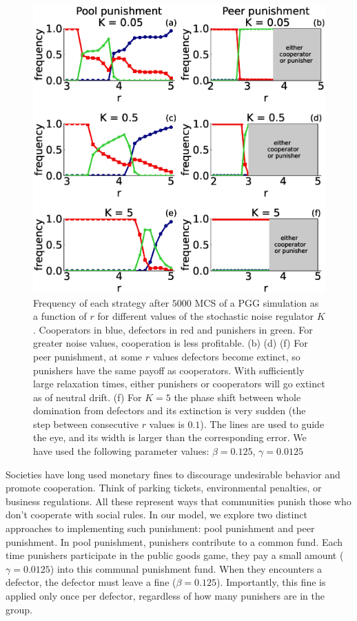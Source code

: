 \begin{figure}
	\centering
	\includegraphics[width=1\linewidth]{Images/P2/densidadVSr_L300t5000variosK.eps}
	\caption{Frequency of each strategy after $5000$ MCS of a PGG simulation as a function of $r$ for different values of the stochastic noise regulator $K$. Cooperators in blue, defectors in red and punishers in green. For greater noise values, cooperation is less profitable. (b) (d) (f) For peer punishment, at some $r$ values defectors become extinct, so  punishers have the same payoff as cooperators. With sufficiently large relaxation times, either punishers or cooperators will go extinct as of neutral drift. (f) For $K=5$ the phase shift between whole domination from defectors and its extinction is very sudden (the step between consecutive $r$ values is $0.1$). The lines are used to guide the eye, and its width is larger than the corresponding error. We have used the following parameter values: $\beta=0.125$, $\gamma=0.0125$}
	\label{densidad}
\end{figure}




Societies have long used monetary fines to discourage undesirable behavior and promote cooperation. Think of parking tickets, environmental penalties, or business regulations. All these represent ways that communities punish those who don't cooperate with social rules. In our model, we explore two distinct approaches to implementing such punishment: pool punishment and peer punishment. 
In pool punishment, punishers contribute to a common fund. Each time punishers participate in the public goods game, they pay a small amount ($\gamma=0.0125$) into this communal punishment fund. When they encounters a defector, the defector must leave a fine ($\beta=0.125$). Importantly, this fine is applied only once per defector, regardless of how many punishers are in the group.

